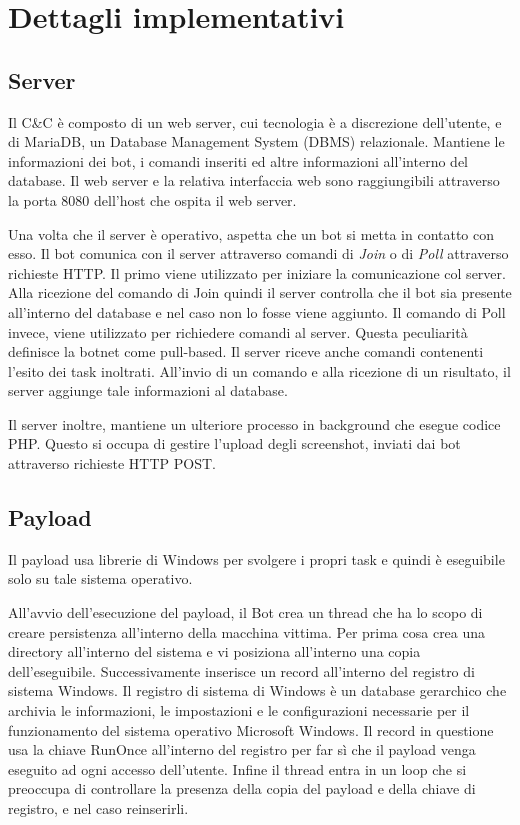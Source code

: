 \section{Dettagli implementativi}

\subsection{Server}
Il C\&C è composto di un web server, cui tecnologia è   a discrezione dell'utente, e di MariaDB, un Database Management System (DBMS) relazionale.
Mantiene le informazioni dei bot, i comandi inseriti ed altre informazioni all'interno del database. Il web server e la relativa interfaccia web sono  raggiungibili attraverso la porta 8080 dell'host che ospita il web server.

Una volta che il server è operativo, aspetta che un bot si metta in contatto con esso.
Il bot comunica con il server attraverso comandi di \textit{Join} o di \textit{Poll} attraverso richieste HTTP. Il primo viene utilizzato per iniziare la comunicazione col server. Alla ricezione del comando di Join quindi il server controlla che il bot sia presente all'interno del database e nel caso non lo fosse viene aggiunto. Il comando di Poll invece, viene utilizzato per richiedere comandi al server. Questa peculiarità  definisce la botnet come pull-based.
Il server riceve anche comandi contenenti l'esito dei task inoltrati.
All'invio  di un comando e alla ricezione di un risultato, il server aggiunge tale informazioni al database.

Il server inoltre,  mantiene un ulteriore processo in background che esegue codice PHP. Questo   si occupa di gestire l'upload degli screenshot, inviati dai bot attraverso richieste HTTP POST.
\subsection{Payload}
\label{Uboat-dettagli-payload}
Il payload usa librerie di Windows per svolgere i propri task e quindi è eseguibile solo su tale sistema operativo.

All'avvio dell'esecuzione del payload, il Bot crea un thread che ha lo scopo di creare persistenza all'interno della macchina vittima.  Per prima cosa crea una directory all'interno del sistema e vi posiziona all'interno una copia dell'eseguibile. Successivamente inserisce un record all'interno del registro di sistema Windows.
Il registro di sistema di Windows è un database gerarchico che archivia le informazioni, le impostazioni e le configurazioni necessarie per il funzionamento  del sistema operativo Microsoft Windows.
Il record in questione usa la chiave RunOnce all'interno del registro per far sì che il payload venga eseguito ad ogni accesso dell'utente. Infine il thread entra in un loop che si preoccupa di controllare la presenza della copia del payload e della chiave di registro, e nel caso reinserirli.

